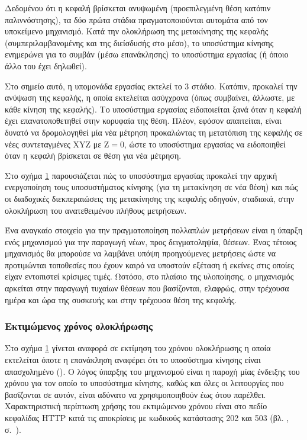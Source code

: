 Δεδομένου ότι η κεφαλή βρίσκεται ανυψωμένη (προεπιλεγμένη θέση κατόπιν
παλιννόστησης), %
τα δύο πρώτα στάδια πραγματοποιούνται αυτομάτα από τον
υποκείμενο μηχανισμό. Κατά την ολοκλήρωση της μετακίνησης της κεφαλής
(συμπεριλαμβανομένης και της διείσδυσής στο μέσο), το υποσύστημα κίνησης
ενημερώνει για το συμβάν (μέσω επανάκλησης) το υποσύστημα εργασίας (ή όποιο άλλο
του έχει δηλωθεί).

Στο σημείο αυτό, η υπομονάδα εργασίας εκτελεί το 3 στάδιο. Κατόπιν,
προκαλεί την ανύψωση της κεφαλής, η οποία εκτελείται ασύγχρονα (όπως συμβαίνει,
άλλωστε, με κάθε κίνηση της κεφαλής). Το υποσύστημα εργασίας ειδοποιείται ξανά
όταν η κεφαλή έχει επανατοποθετηθεί στην κορυφαία της θέση. Πλέον, εφόσον
απαιτείται, είναι δυνατό να δρομολογηθεί μία νέα μέτρηση προκαλώντας τη
μετατόπιση της κεφαλής σε νέες συντεταγμένες XYZ με $\text{Z} = 0$, ώστε το
υποσύστημα εργασίας να ειδοποιηθεί όταν η κεφαλή βρίσκεται σε θέση για νέα
μέτρηση.

Στο σχήμα \ref{fig:task:samples} παρουσιάζεται πώς το υποσύστημα εργασίας
προκαλεί την αρχική ενεργοποίηση τους υποσυστήματος κίνησης (για τη μετακίνηση
σε νέα θέση) και πώς οι διαδοχικές διεκπεραιώσεις της μετακίνησης της κεφαλής
οδηγούν, σταδιακά, στην ολοκλήρωση του ανατεθειμένου πλήθους μετρήσεων.

\begin{figure}
    \caption{
    \label{fig:task:samples}}
\end{figure}

Ένα αναγκαίο στοιχείο για την πραγματοποίηση πολλαπλών μετρήσεων είναι η ύπαρξη
ενός μηχανισμού για την παραγωγή νέων, προς δειγματοληψία, θέσεων. Ένας τέτοιος
μηχανισμός θα μπορούσε να λαμβάνει υπόψη προηγούμενες μετρήσεις ώστε να
προτιμώνται τοποθεσίες που έχουν καιρό να υποστούν εξέταση ή εκείνες στις οποίες
είχαν εντοπιστεί κρίσιμες τιμές. Ωστόσο, στο πλαίσιο της υλοποίησης, ο
μηχανισμός αρκείται στην παραγωγή τυχαίων θέσεων που βασίζονται, ελαφρώς, στην
τρέχουσα ημέρα και ώρα της συσκευής
και στην τρέχουσα θέση της κεφαλής.


\subsubsection{Εκτιμώμενος χρόνος ολοκλήρωσης}

Στο σχήμα \ref{fig:task:samples} γίνεται αναφορά σε εκτίμηση του χρόνου
ολοκλήρωσης η οποία εκτελείται όποτε η επανάκληση αναφέρει ότι το υποσύστημα
κίνησης είναι απασχολημένο (). Ο λόγος ύπαρξης του μηχανισμού είναι η
παροχή μίας ένδειξης του χρόνου για τον οποίο το υποσύστημα κίνησης, καθώς και
όλες οι λειτουργίες που βασίζονται σε αυτόν, είναι αδύνατο να χρησιμοποιηθούν
έως ότου παρέλθει. Χαρακτηριστική περίπτωση χρήσης του εκτιμώμενου χρόνου είναι
στο πεδίο κεφαλίδας HTTP  κατά τις αποκρίσεις με κωδικούς
κατάστασης 202 και 503 (βλ. ,
σ.~\pageref{sec:network:impl-resources}).

